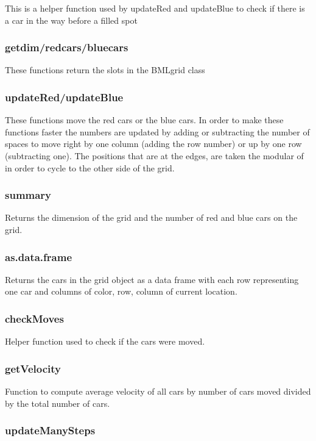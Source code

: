 \documentclass[11pt]{article}
\begin{document}
    This is a helper function used by updateRed and updateBlue to
    check if there is a car in the way before a filled spot
\subsubsection{getdim/redcars/bluecars}
\label{sec-1-2-4}

    These functions return the slots in the BMLgrid class
\subsubsection{updateRed/updateBlue}
\label{sec-1-2-5}

    These functions move the red cars or the blue cars.  In order to
    make these functions faster the numbers are updated by adding or
    subtracting the number of spaces to move right by one column
    (adding the row number) or up by one row (subtracting one).  The
    positions that are at the edges, are taken the modular of in order
    to cycle to the other side of the grid.
\subsubsection{summary}
\label{sec-1-2-6}

    Returns the dimension of the grid and the number of red and blue
    cars on the grid.
\subsubsection{as.data.frame}
\label{sec-1-2-7}

    Returns the cars in the grid object as a data frame with each row
    representing one car and columns of color, row, column of current location.
\subsubsection{checkMoves}
\label{sec-1-2-8}

    Helper function used to check if the cars were moved.
\subsubsection{getVelocity}
\label{sec-1-2-9}

    Function to compute average velocity of all cars by number of cars
    moved divided by the total number of cars.
\subsubsection{updateManySteps}
\label{sec-1-2-10}
\end{document}
